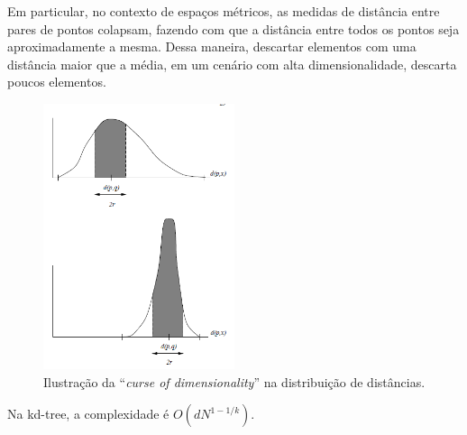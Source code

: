 Em particular, no contexto de espaços métricos, as medidas de distância entre pares de pontos colapsam, fazendo com que a distância entre todos os pontos seja aproximadamente a mesma. Dessa maneira, descartar elementos com uma distância maior que a média, em um cenário com alta dimensionalidade, descarta poucos elementos.

\begin{figure}
    \centering
    \includegraphics[width=0.5\textwidth]{imgs/distribution_curse.png}
    \caption{Ilustração da ``\textit{curse of dimensionality}'' na distribuição de distâncias.}
    \label{fig:distribution_curse}
\end{figure}


Na kd-tree, a complexidade é
$O(d N^{1 - 1/k})$\cite{worstcase:lee1977}.


\cite{searching:navarro2002,searching:chavez2001}

\subsection{}

\printbibliography